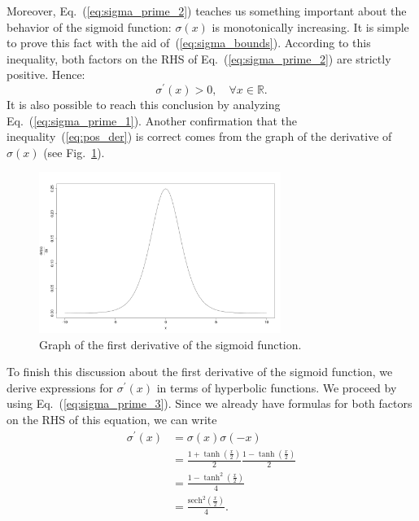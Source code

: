 \documentclass[10pt,american]{scrartcl}
\begin{document}
Moreover, Eq.~(\ref{eq:sigma_prime_2}) teaches us something important about the
behavior of the sigmoid function: $\sigma\left(x\right)$ is monotonically
increasing. It is simple to prove this fact with the aid
of~(\ref{eq:sigma_bounds}). According to this inequality, both factors on the
RHS of Eq.~(\ref{eq:sigma_prime_2}) are strictly positive. Hence:
\begin{equation}
\sigma^{\prime}\left(x\right)>0,\quad\forall x\in\mathbb{R}.
\label{eq:pos_der}
\end{equation}
It is also possible to reach this conclusion by analyzing
Eq.~(\ref{eq:sigma_prime_1}). Another confirmation that the
inequality~(\ref{eq:pos_der}) is correct comes from the graph of the derivative
of $\sigma\left(x\right)$ (see Fig.~\ref{fig:graph_sigma_prime}).
\begin{figure}[H]
\centering
\includegraphics[width=0.7\textwidth]{../r/derivative_sigmoid.png}
\caption{Graph of the first derivative of the sigmoid function.}
\label{fig:graph_sigma_prime}
\end{figure}

To finish this discussion about the first derivative of the sigmoid function,
we derive expressions for $\sigma^{\prime}\left(x\right)$ in terms of
hyperbolic functions. We proceed by using Eq.~(\ref{eq:sigma_prime_3}). Since
we already have formulas for both factors on the RHS of this equation, we can
write
\begin{align}
\nonumber\sigma^{\prime}\left(x\right)&=\sigma\left(x\right)\sigma\left(-x\right)\\
\nonumber&=\frac{1+\tanh\left(\frac{x}{2}\right)}{2}\frac{1-\tanh\left(\frac{x}{2}\right)}{2}\\
\nonumber&=\frac{1-\tanh^{2}\left(\frac{x}{2}\right)}{4}\\
&=\frac{\mathrm{sech}^{2}\left(\frac{x}{2}\right)}{4}.
\end{align}
\end{document}
